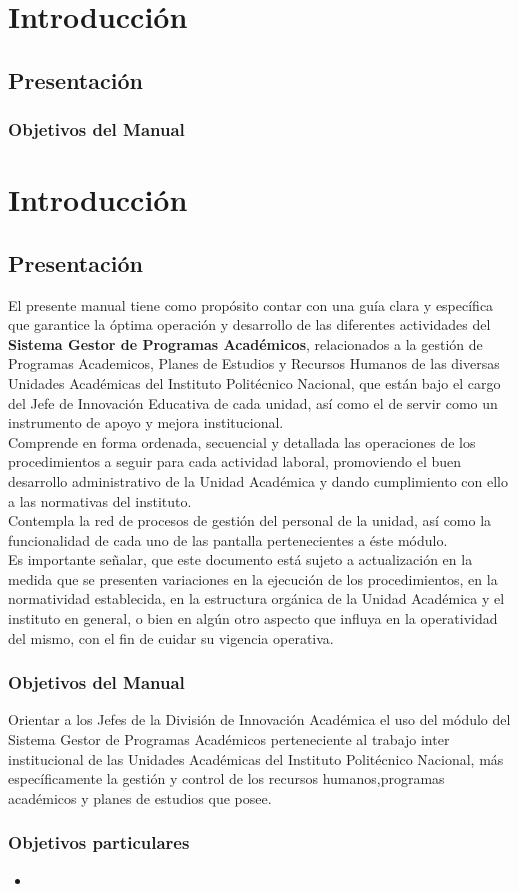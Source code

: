 \chapter{Introducción}
\section{Presentación}
\subsection{Objetivos del Manual}
\chapter{Introducción}
\section{Presentación}
El presente manual tiene como propósito contar con una guía clara y específica que garantice la óptima operación y desarrollo de las diferentes actividades del \textbf{Sistema Gestor de Programas Académicos}, relacionados a la gestión de Programas Academicos, Planes de Estudios y Recursos Humanos de las diversas Unidades Académicas del Instituto Politécnico Nacional, que están bajo el cargo del Jefe de Innovación Educativa de cada unidad, así como el de servir como un instrumento de apoyo y mejora institucional.\\

Comprende en forma ordenada, secuencial y detallada las operaciones de los procedimientos a seguir para cada actividad laboral, promoviendo el buen desarrollo administrativo de la Unidad Académica y dando cumplimiento con ello a las normativas del instituto.\\

Contempla la red de procesos de gestión del personal de la unidad, así como la funcionalidad de cada uno de las pantalla pertenecientes a éste módulo.\\

Es importante señalar, que este documento está sujeto a actualización en la medida que se presenten variaciones en la ejecución de los procedimientos, en la normatividad establecida, en la estructura orgánica de la Unidad Académica y el instituto en general, o bien en algún otro aspecto que influya en la operatividad del mismo, con el fin de cuidar su vigencia operativa.\\

    \subsection{Objetivos del Manual}
     Orientar a los Jefes de la División de Innovación Académica el uso del módulo del Sistema Gestor de Programas Académicos perteneciente al trabajo inter institucional de las Unidades Académicas del Instituto Politécnico Nacional, más específicamente la gestión y control de los recursos humanos,programas académicos y planes de estudios que posee.
    
    \subsection{Objetivos particulares}
    \begin{itemize}
        \item %
    \end{itemize}
